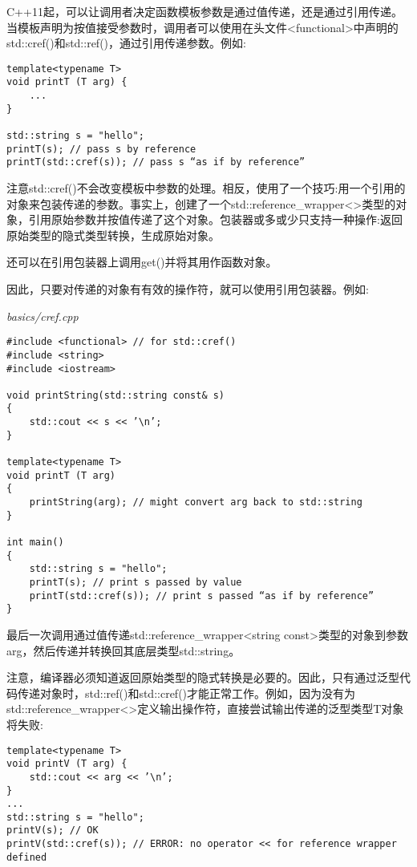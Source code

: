 C++11起，可以让调用者决定函数模板参数是通过值传递，还是通过引用传递。当模板声明为按值接受参数时，调用者可以使用在头文件<functional>中声明的std::cref()和std::ref()，通过引用传递参数。例如:

\begin{lstlisting}[style=styleCXX]
template<typename T>
void printT (T arg) {
	...
}

std::string s = "hello";
printT(s); // pass s by reference
printT(std::cref(s)); // pass s “as if by reference”
\end{lstlisting}

注意std::cref()不会改变模板中参数的处理。相反，使用了一个技巧:用一个引用的对象来包装传递的参数。事实上，创建了一个std::reference\_wrapper<>类型的对象，引用原始参数并按值传递了这个对象。包装器或多或少只支持一种操作:返回原始类型的隐式类型转换，生成原始对象。

\begin{tcolorbox}[colback=webgreen!5!white,colframe=webgreen!75!black]
\hspace*{0.75cm}还可以在引用包装器上调用get()并将其用作函数对象。
\end{tcolorbox}

因此，只要对传递的对象有有效的操作符，就可以使用引用包装器。例如:

\noindent
\textit{basics/cref.cpp}
\begin{lstlisting}[style=styleCXX]
#include <functional> // for std::cref()
#include <string>
#include <iostream>

void printString(std::string const& s)
{
	std::cout << s << ’\n’;
}

template<typename T>
void printT (T arg)
{
	printString(arg); // might convert arg back to std::string
}

int main()
{
	std::string s = "hello";
	printT(s); // print s passed by value
	printT(std::cref(s)); // print s passed “as if by reference”
}
\end{lstlisting}

最后一次调用通过值传递std::reference\_wrapper<string const>类型的对象到参数arg，然后传递并转换回其底层类型std::string。

注意，编译器必须知道返回原始类型的隐式转换是必要的。因此，只有通过泛型代码传递对象时，std::ref()和std::cref()才能正常工作。例如，因为没有为std::reference\_wrapper<>定义输出操作符，直接尝试输出传递的泛型类型T对象将失败:

\begin{lstlisting}[style=styleCXX]
template<typename T>
void printV (T arg) {
	std::cout << arg << ’\n’;
}
...
std::string s = "hello";
printV(s); // OK
printV(std::cref(s)); // ERROR: no operator << for reference wrapper defined
\end{lstlisting}

